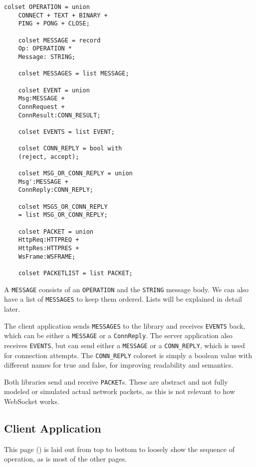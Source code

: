 	\begin{lstlisting}[label=lst:overview_colset,caption=Overview color
	sets,gobble=1]
	colset OPERATION = union
	CONNECT + TEXT + BINARY + 
	PING + PONG + CLOSE;
	
	colset MESSAGE = record
	Op: OPERATION *
	Message: STRING;
	
	colset MESSAGES = list MESSAGE;
	
	colset EVENT = union
	Msg:MESSAGE +
	ConnRequest +
	ConnResult:CONN_RESULT;
	
	colset EVENTS = list EVENT;
	
	colset CONN_REPLY = bool with
	(reject, accept);
	
	colset MSG_OR_CONN_REPLY = union
	Msg':MESSAGE +
	ConnReply:CONN_REPLY;
	
	colset MSGS_OR_CONN_REPLY 
	= list MSG_OR_CONN_REPLY;
	
	colset PACKET = union 
	HttpReq:HTTPREQ + 
	HttpRes:HTTPRES +
	WsFrame:WSFRAME;
	
	colset PACKETLIST = list PACKET;
	\end{lstlisting}
	
	A \lstinline:MESSAGE: consists of an \lstinline:OPERATION: and the
	\lstinline:STRING: message body. We can also have a list of
	\lstinline:MESSAGES: to keep them ordered. Lists will be explained in
	detail later.
	
	The client application sends \lstinline:MESSAGES: to the library and receives
	\lstinline:EVENTS: back, which can be either a \lstinline:MESSAGE: or a
	\lstinline:ConnReply:. The server application also receives \lstinline:EVENTS:,
	but can send either a \lstinline:MESSAGE: or a \lstinline:CONN_REPLY:, which is
	used for connection attempts. The \lstinline:CONN_REPLY: colorset is simply a
	boolean value with different names for true and false, for improving readability
	and semantics.
	
	Both libraries send and receive \lstinline:PACKET:s. These are abstract and not
	fully modeled or simulated actual network packets, as this is not relevant to
	how WebSocket works.

\subsection{Client Application}

	
	This page () is laid out from top to bottom to loosely show
	the sequence of operation, as is most of the other pages.
	
